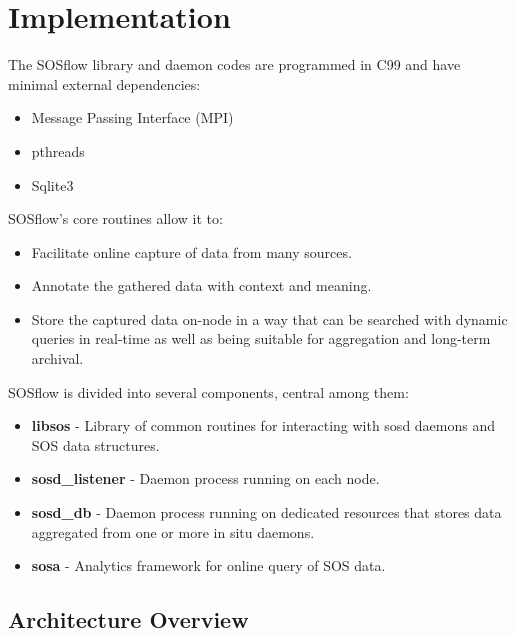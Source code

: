 \section{Implementation}
%
The SOSflow library and daemon codes are programmed in C99 and have
minimal external dependencies:
%
\begin{itemize}
    \item Message Passing Interface (MPI)
    \item pthreads
    \item Sqlite3
\end{itemize}
%
SOSflow's core routines allow it to:
%
\begin{itemize}
    \item Facilitate online capture of data from many sources.
    \item Annotate the gathered data with context and meaning.
    \item Store the captured data on-node in a way that can be
      searched with dynamic queries in real-time as well as being
      suitable for aggregation and long-term archival.
\end{itemize}
%
%
SOSflow is divided into several components, central among them:
%
\begin{itemize}
    \item \textbf{libsos} - Library of common routines for interacting with
      sosd daemons and SOS data structures.
    \item \textbf{sosd\_listener} - Daemon process running on each node.
    \item \textbf{sosd\_db} - Daemon process running on dedicated resources
      that stores data aggregated from one or more in situ daemons.
    \item \textbf{sosa} - Analytics framework for online query of SOS data.
\end{itemize}

\subsection{Architecture Overview} %


